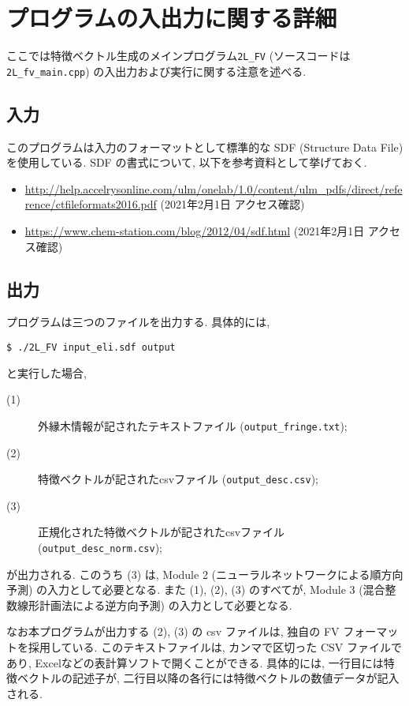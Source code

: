 \documentclass[11pt, titlepage, dvipdfmx, twoside]{jarticle}
\begin{document}
\clearpage
\section{プログラムの入出力に関する詳細}
\label{sec:io}

ここでは特徴ベクトル生成のメインプログラム{\tt 2L\_FV}
(ソースコードは {\tt 2L\_fv\_main.cpp})
の入出力および実行に関する注意を述べる. 

\subsection{入力}

このプログラムは入力のフォーマットとして標準的な SDF (Structure Data File) を使用している.
SDF の書式について, 以下を参考資料として挙げておく. 
\begin{itemize}
\item \url{http://help.accelrysonline.com/ulm/onelab/1.0/content/ulm_pdfs/direct/reference/ctfileformats2016.pdf} (2021年2月1日 アクセス確認)
\item \url{https://www.chem-station.com/blog/2012/04/sdf.html} (2021年2月1日 アクセス確認)
\end{itemize}



\subsection{出力}
プログラムは三つのファイルを出力する. 具体的には, 
\begin{oframed}
{\small
\verb|$ ./2L_FV input_eli.sdf output|
}
\end{oframed}
と実行した場合, 
\begin{description}
\item[(1)] 外縁木情報が記されたテキストファイル (\verb|output_fringe.txt|);
\item[(2)] 特徴ベクトルが記されたcsvファイル (\verb|output_desc.csv|);
\item[(3)] 正規化された特徴ベクトルが記されたcsvファイル (\verb|output_desc_norm.csv|);
\end{description}
  が出力される. 
このうち (3) は, Module 2 (ニューラルネットワークによる順方向予測)
の入力として必要となる. また (1), (2), (3) のすべてが,
Module 3 (混合整数線形計画法による逆方向予測) の入力として必要となる.


なお本プログラムが出力する (2), (3) の csv ファイルは,
独自の FV フォーマットを採用している.
このテキストファイルは, カンマで区切った CSV ファイルであり,
Excelなどの表計算ソフトで開くことができる.
具体的には, 一行目には特徴ベクトルの記述子が,
二行目以降の各行には特徴ベクトルの数値データが記入される.
\end{document}
